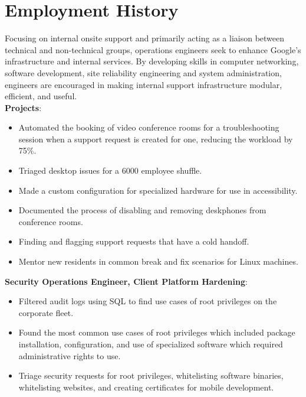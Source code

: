 \documentclass[letter,sans]{moderncv}
\begin{document}
\maketitle

\vspace{-0.6in}

\section{Employment History}
{Focusing on internal onsite support and primarily acting as a liaison between technical and non-technical groups, operations engineers seek to enhance Google's infrastructure and internal services. By developing skills in computer networking, software development, site reliability engineering and system administration, engineers are encouraged in making internal support infrastructure modular, efficient, and useful.\\
  \textbf{Projects}:
  \begin{itemize}
	\item Automated the booking of video conference rooms for a troubleshooting session when a support request is created for one, reducing the workload by 75\%.
    \item Triaged desktop issues for a 6000 employee shuffle.
    \item Made a custom configuration for specialized hardware for use in accessibility.
	\item Documented the process of disabling and removing deskphones from conference rooms.
    \item Finding and flagging support requests that have a cold handoff.
	\item Mentor new residents in common break and fix scenarios for Linux machines.
  \end{itemize}
  \textbf{Security Operations Engineer, Client Platform Hardening}:
  \begin{itemize}
    \item Filtered audit logs using SQL to find use cases of root privileges on the corporate fleet.
	\item Found the most common use cases of root privileges which included package installation, configuration, and use of specialized software which required administrative rights to use.
    \item Triage security requests for root privileges, whitelisting software binaries, whitelisting websites, and creating certificates for mobile development.

\end{itemize}}
\end{document}
